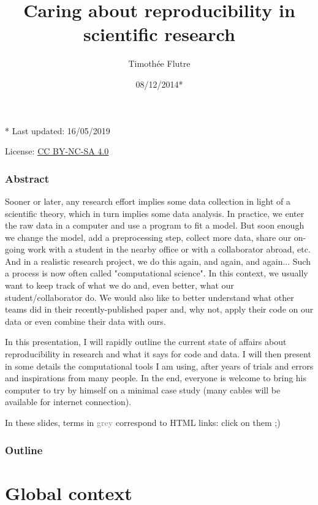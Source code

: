 \documentclass[c]{beamer} %
\title[Reproducible research]{Caring about reproducibility in scientific research}
\author[T. Flutre]{Timoth\'{e}e Flutre}
\institute[INRA]{INRA, UMR AGAP}
\date{08/12/2014*}
\begin{document}
\begin{frame}
  \titlepage
  
  \tiny
  \begin{center}
    * Last updated: 16/05/2019
    
    \medskip
    
    License: \href{http://creativecommons.org/licenses/by-nc-sa/4.0/}{CC BY-NC-SA 4.0}
  \end{center}
\end{frame}                                                                                                                       
\begin{frame}
  \frametitle{Abstract}
  \tiny
  Sooner or later, any research effort implies some data collection in light of a scientific theory, which in turn implies some data analysis. In practice, we enter the raw data in a computer and use a program to fit a model. But soon enough we change the model, add a preprocessing step, collect more data, share our on-going work with a student in the nearby office or with a collaborator abroad, etc. And in a realistic research project, we do this again, and again, and again... Such a process is now often called "computational science". In this context, we usually want to keep track of what we do and, even better, what our student/collaborator do. We would also like to better understand what other teams did in their recently-published paper and, why not, apply their code on our data or even combine their data with ours.
  
  \medskip
  
  In this presentation, I will rapidly outline the current state of affairs about reproducibility in research and what it says for code and data. I will then present in some details the computational tools I am using, after years of trials and errors and inspirations from many people. In the end, everyone is welcome to bring his computer to try by himself on a minimal case study (many cables will be available for internet connection).
  
  \bigskip
  
  In these slides, terms in \textcolor{gray}{grey} correspond to HTML links: click on them ;)
\end{frame}

\begin{frame}
  \frametitle{Outline}
  \tableofcontents
\end{frame}

\section{Global context}
\end{document}
